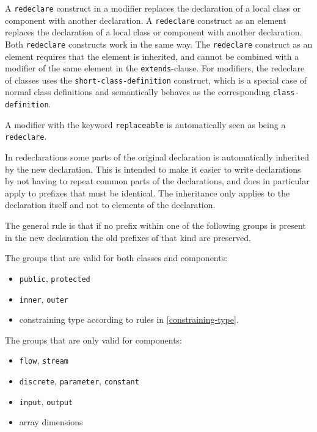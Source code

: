 A \lstinline!redeclare! construct in a modifier replaces the declaration of a local class or component with another declaration.
A \lstinline!redeclare! construct as an element replaces the declaration of a local class or component with another declaration.
Both \lstinline!redeclare! constructs work in the same way.
The \lstinline!redeclare! construct as an element requires that the element is inherited, and cannot be combined with a modifier of the same element in the \lstinline!extends!-clause.
For modifiers, the redeclare of classes uses the \lstinline[language=grammar]!short-class-definition! construct, which is a special case of normal class definitions and semantically behaves as the corresponding \lstinline[language=grammar]!class-definition!.

A modifier with the keyword \lstinline!replaceable! is automatically seen as being a \lstinline!redeclare!.

In redeclarations some parts of the original declaration is
automatically inherited by the new declaration. This is intended to make
it easier to write declarations by not having to repeat common parts of
the declarations, and does in particular apply to prefixes that must be
identical. The inheritance only applies to the declaration itself and
not to elements of the declaration.

The general rule is that if no prefix within one of the following groups
is present in the new declaration the old prefixes of that kind are
preserved.

The groups that are valid for both classes and components:
\begin{itemize}
\item
  \lstinline!public!, \lstinline!protected!
\item
  \lstinline!inner!, \lstinline!outer!
\item
  constraining type according to rules in \cref{constraining-type}.
\end{itemize}

The groups that are only valid for components:
\begin{itemize}
\item
  \lstinline!flow!, \lstinline!stream!
\item
  \lstinline!discrete!, \lstinline!parameter!, \lstinline!constant!
\item
  \lstinline!input!, \lstinline!output!
\item
  array dimensions
\end{itemize}

